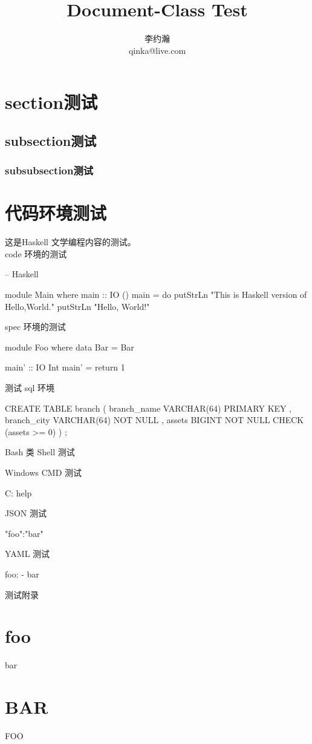 \documentclass{dingo}
\title{Document-Class Test}
\author{李约瀚\\ qinka@live.com}
\begin{document}
    \makecover
    \makecontent
    \section{section测试}
    \subsection{subsection测试}
    \subsubsection{subsubsection测试}
    \section{代码环境测试}
    这是Haskell 文学编程内容的测试。
    \\
    code 环境的测试
    \begin{code}
-- Haskell

module Main where
	main :: IO ()
	main = do
		putStrLn "This is Haskell version of Hello,World."
		putStrLn "Hello, World!"
    \end{code}
	 spec 环境的测试
	\begin{spec}
module Foo where
	data Bar = Bar
    \end{spec}
    \begin{code}
  main' :: IO Int
  main' = return 1
    \end{code}
    测试 sql 环境
    \begin{sql}
CREATE TABLE branch
	( branch_name VARCHAR(64) PRIMARY KEY
	, branch_city VARCHAR(64) NOT NULL
	, assets      BIGINT NOT NULL CHECK (assets >= 0)
	)
;
    \end{sql}
    Bash 类 Shell 测试
    Windows CMD 测试
    \begin{cmd}
 C:\> help
    \end{cmd}
    JSON 测试
    \begin{json}
 {"foo":"bar"}
    \end{json}
    YAML 测试
    \begin{yaml}
 foo:
   - bar  
    \end{yaml}
    测试附录
    \begin{appendix}
    	\section{foo}
    	bar
    	\section{BAR}
    	FOO
     \end{appendix}
\end{document}
